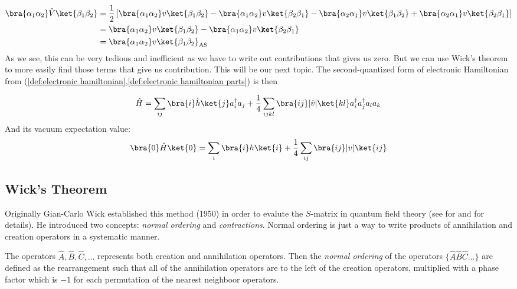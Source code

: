 \begin{align}
\bra{\alpha_1\alpha_2}\hat{V}\ket{\beta_1\beta_2} &= \frac{1}{2} \left[ \bra{\alpha_1\alpha_2}v\ket{\beta_1\beta_2} - \bra{\alpha_1\alpha_2}v\ket{\beta_2\beta_1} - \bra{\alpha_2\alpha_1}v\ket{\beta_1\beta_2} + \bra{\alpha_2\alpha_1}v\ket{\beta_2\beta_1} \right]\\
 &= \bra{\alpha_1\alpha_2}v\ket{\beta_1\beta_2} - \bra{\alpha_1\alpha_2}v\ket{\beta_2\beta_1}\\
 &= \bra{\alpha_1\alpha_2}v\ket{\beta_1\beta_2}_{\text{AS}} 
 \label{res:twobodyexpectation}
\end{align}
%
As we see, this can be very tedious and inefficient as we have to write out contributions that gives us zero. But we can use Wick's theorem to more easily find those terms that give us contribution. This will be our next topic. The second-quantized form of electronic Hamiltonian from (\ref{def:electronic hamiltonian},\ref{def:electronic hamiltonian parts}) is then %

\begin{equation}
\hat{H} = \sum_{ij} \bra{i}\hat{h}\ket{j}a_i^{\dagger} a_j+ \frac{1}{4} \sum_{ijkl} \bra{ij}|\hat{v}|\ket{kl} a_i^{\dagger} a_j^{\dagger} a_l a_k
 \label{def:secondquantized hamiltonian}
\end{equation}
%
And its vacuum expectation value:
\begin{equation}
\bra{0}\hat{H}\ket{0} = \sum_{i} \bra{i}h\ket{i} + \frac{1}{4} \sum_{ij} \bra{ij}|v|\ket{ij}
 \label{eq:second-qunatized vacuum expectation value}
\end{equation}


\subsection{Wick's Theorem}
Originally Gian-Carlo Wick established this method (1950) in order to evalute the $S$-matrix in quantum field theory (see for \cite{wick} and \cite{chang} for details). He introduced two concepts: \emph{normal ordering} and \emph{contractions}. Normal ordering is just a way to write products of annihilation and creation operators in a systematic manner. 

The operators $\hat{A},\hat{B},\hat{C},...$ represents both creation and annihilation operators. Then the \emph{normal ordering} of the operators $\{\hat{A}\hat{B}\hat{C}...\}$ are defined as the rearrangement such that all of the annihilation operators are to the left of the creation operators, multiplied with a phase factor which is $-1$ for each permutation of the nearest neighboor operators.


